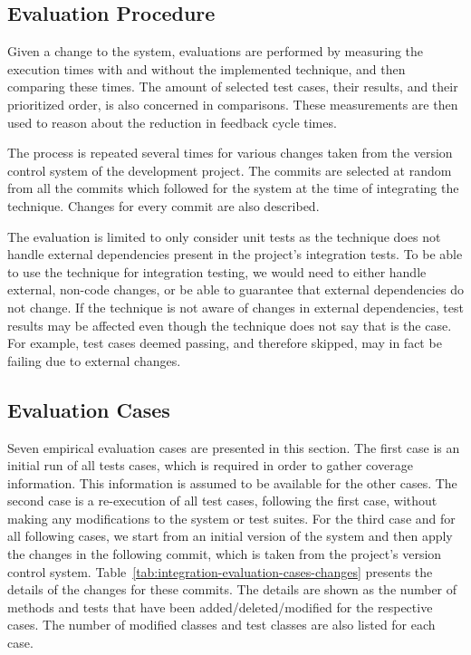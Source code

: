 \documentclass[a4paper,english,12pt]{report}
\begin{document}
\subsection{Evaluation Procedure}
Given a change to the system, evaluations are performed by measuring the execution times with and without the implemented technique, and then comparing these times. The amount of selected test cases, their results, and their prioritized order, is also concerned in comparisons. These measurements are then used to reason about the reduction in feedback cycle times.

The process is repeated several times for various changes taken from the version control system of the development project. The commits are selected at random from all the commits which followed for the system at the time of integrating the technique. Changes for every commit are also described.

The evaluation is limited to only consider unit tests as the technique does not handle external dependencies present in the project's integration tests. To be able to use the technique for integration testing, we would need to either handle external, non-code changes, or be able to guarantee that external dependencies do not change. If the technique is not aware of changes in external dependencies, test results may be affected even though the technique does not say that is the case. For example, test cases deemed passing, and therefore skipped, may in fact be failing due to external changes.

\subsection{Evaluation Cases}\label{sec:evaluation-cases}
Seven empirical evaluation cases are presented in this section. The first case is an initial run of all tests cases, which is required in order to gather coverage information. This information is assumed to be available for the other cases. The second case is a re-execution of all test cases, following the first case, without making any modifications to the system or test suites. For the third case and for all following cases, we start from an initial version of the system and then apply the changes in the following commit, which is taken from the project's version control system. Table~\vref{tab:integration-evaluation-cases-changes} presents the details of the changes for these commits. The details are shown as the number of methods and tests that have been added/deleted/modified for the respective cases. The number of modified classes and test classes are also listed for each case.
\end{document}
